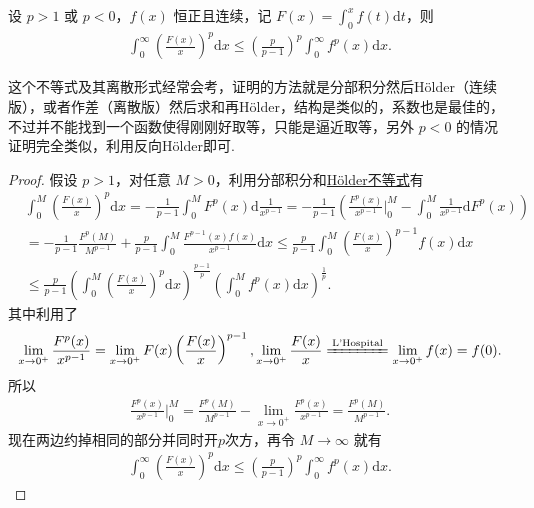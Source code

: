\documentclass[../../main.tex]{subfiles}%
\begin{document}
\begin{theorem}[Hardy不等式]\label{theorem:Hardy(哈代)不等式}
设 $p > 1$ 或 $p < 0$，$f(x)$ 恒正且连续，记 $F(x) = \int_0^x f(t) \mathrm{d}t$，则
\begin{align*}
\int_0^\infty \left( \frac{F(x)}{x} \right)^p \mathrm{d}x \leqslant \left( \frac{p}{p - 1} \right)^p \int_0^\infty f^p(x) \mathrm{d}x.
\end{align*}
\end{theorem}
\begin{remark}
这个不等式及其离散形式经常会考，证明的方法就是分部积分然后Hölder（连续版），或者作差（离散版）然后求和再Hölder，结构是类似的，系数也是最佳的，不过并不能找到一个函数使得刚刚好取等，只能是逼近取等，另外 $p < 0$ 的情况证明完全类似，利用反向Hölder即可.
\end{remark}
\begin{proof}
假设 $p > 1$，对任意 $M > 0$，利用分部积分和\hyperref[theorem:Hölder(H\"older)不等式(积分形式)]{Hölder不等式}有
\begin{align*}
&\int_0^M \left( \frac{F(x)}{x} \right)^p \mathrm{d}x = -\frac{1}{p - 1} \int_0^M F^p(x) \mathrm{d}\frac{1}{x^{p - 1}} = -\frac{1}{p - 1} \left( \frac{F^p(x)}{x^{p - 1}} \bigg|_0^M - \int_0^M \frac{1}{x^{p - 1}} \mathrm{d}F^p(x) \right)
\\
&= -\frac{1}{p - 1} \frac{F^p(M)}{M^{p - 1}} + \frac{p}{p - 1} \int_0^M \frac{F^{p - 1}(x) f(x)}{x^{p - 1}} \mathrm{d}x \leqslant \frac{p}{p - 1} \int_0^M \left( \frac{F(x)}{x} \right)^{p - 1} f(x) \mathrm{d}x
\\
&\leqslant \frac{p}{p - 1} \left( \int_0^M \left( \frac{F(x)}{x} \right)^p \mathrm{d}x \right)^{\frac{p - 1}{p}} \left( \int_0^M f^p(x) \mathrm{d}x \right)^{\frac{1}{p}}.
\end{align*}
其中利用了
\begin{align*}
\lim_{x \to 0^+} \frac{F^p(x)}{x^{p - 1}} = \lim_{x \to 0^+} F(x) \left( \frac{F(x)}{x} \right)^{p - 1}, \lim_{x \to 0^+} \frac{F(x)}{x} \xlongequal{\text{L'Hospital}} \lim_{x \to 0^+} f(x) = f(0).
\end{align*}
所以
\begin{align*}
\frac{F^p(x)}{x^{p - 1}} \bigg|_0^M = \frac{F^p(M)}{M^{p - 1}} - \lim_{x \to 0^+} \frac{F^p(x)}{x^{p - 1}} = \frac{F^p(M)}{M^{p - 1}}.
\end{align*}
现在两边约掉相同的部分并同时开$p$次方，再令 $M \to \infty$ 就有
\begin{align*}
\int_0^\infty \left( \frac{F(x)}{x} \right)^p \mathrm{d}x \leqslant \left( \frac{p}{p - 1} \right)^p \int_0^\infty f^p(x) \mathrm{d}x.
\end{align*}
\end{proof}
\end{document}
